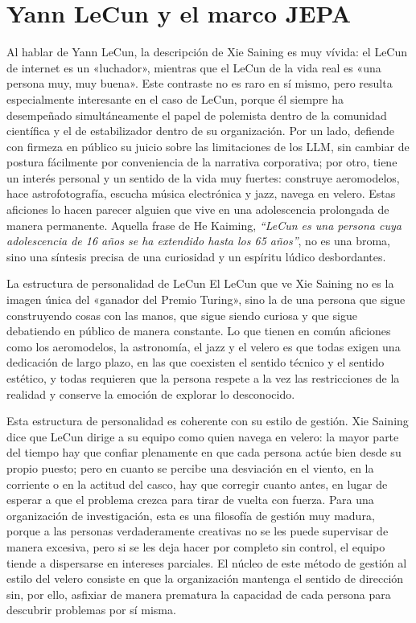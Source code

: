 \section{Yann LeCun y el marco JEPA}

Al hablar de Yann LeCun, la descripción de Xie Saining es muy vívida: el LeCun de internet es un «luchador», mientras que el LeCun de la vida real es «una persona muy, muy buena». Este contraste no es raro en sí mismo, pero resulta especialmente interesante en el caso de LeCun, porque él siempre ha desempeñado simultáneamente el papel de polemista dentro de la comunidad científica y el de estabilizador dentro de su organización. Por un lado, defiende con firmeza en público su juicio sobre las limitaciones de los LLM, sin cambiar de postura fácilmente por conveniencia de la narrativa corporativa; por otro, tiene un interés personal y un sentido de la vida muy fuertes: construye aeromodelos, hace astrofotografía, escucha música electrónica y jazz, navega en velero. Estas aficiones lo hacen parecer alguien que vive en una adolescencia prolongada de manera permanente. Aquella frase de He Kaiming, \textit{``LeCun es una persona cuya adolescencia de 16 años se ha extendido hasta los 65 años''}, no es una broma, sino una síntesis precisa de una curiosidad y un espíritu lúdico desbordantes.

\begin{knowledgebox}{La estructura de personalidad de LeCun}
El LeCun que ve Xie Saining no es la imagen única del «ganador del Premio Turing», sino la de una persona que sigue construyendo cosas con las manos, que sigue siendo curiosa y que sigue debatiendo en público de manera constante. Lo que tienen en común aficiones como los aeromodelos, la astronomía, el jazz y el velero es que todas exigen una dedicación de largo plazo, en las que coexisten el sentido técnico y el sentido estético, y todas requieren que la persona respete a la vez las restricciones de la realidad y conserve la emoción de explorar lo desconocido.
\end{knowledgebox}

Esta estructura de personalidad es coherente con su estilo de gestión. Xie Saining dice que LeCun dirige a su equipo como quien navega en velero: la mayor parte del tiempo hay que confiar plenamente en que cada persona actúe bien desde su propio puesto; pero en cuanto se percibe una desviación en el viento, en la corriente o en la actitud del casco, hay que corregir cuanto antes, en lugar de esperar a que el problema crezca para tirar de vuelta con fuerza. Para una organización de investigación, esta es una filosofía de gestión muy madura, porque a las personas verdaderamente creativas no se les puede supervisar de manera excesiva, pero si se les deja hacer por completo sin control, el equipo tiende a dispersarse en intereses parciales. El núcleo de este método de gestión al estilo del velero consiste en que la organización mantenga el sentido de dirección sin, por ello, asfixiar de manera prematura la capacidad de cada persona para descubrir problemas por sí misma.

